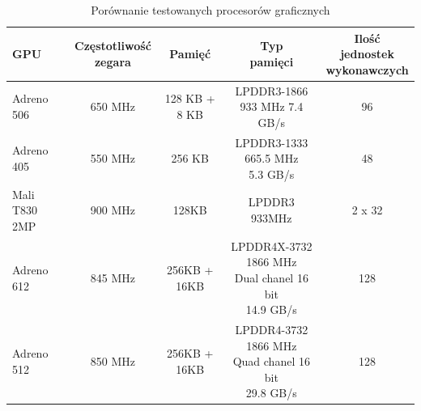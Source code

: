 \begin{table}[H]
    \caption{Porównanie testowanych procesorów graficznych}
    \label{tab:skale}
    \begin{tabular}{|l|c|c|c|c|}
\hline
\textbf{GPU} & \makecell{\textbf{Częstotliwość} \\ \textbf{zegara}} & \textbf{Pamięć} & \makecell{\textbf{Typ} \\ \textbf{pamięci}} & \makecell{\textbf{Ilość jednostek} \\ \textbf{wykonawczych}}\\
\hline
Adreno 506 & 650 MHz & 128 KB + 8 KB & \makecell{LPDDR3-1866 \\ 933 MHz 7.4 GB/s} & 96\\
\hline
Adreno 405 & 550 MHz & 256 KB & \makecell{LPDDR3-1333 665.5 MHz \\ 5.3 GB/s} & 48\\
\hline
Mali T830 2MP & 900 MHz & 128KB & \makecell{LPDDR3 \\ 933MHz} & 2 x 32\\
\hline
Adreno 612 & 845 MHz & 256KB + 16KB & \makecell{LPDDR4X-3732 1866 MHz \\ Dual chanel 16 bit \\ 14.9 GB/s} & 128\\
\hline
Adreno 512 & 850 MHz & 256KB + 16KB & \makecell{LPDDR4-3732 1866 MHz \\ Quad chanel 16 bit \\ 29.8 GB/s} & 128\\
\hline
\end{tabular}
\end{table}

